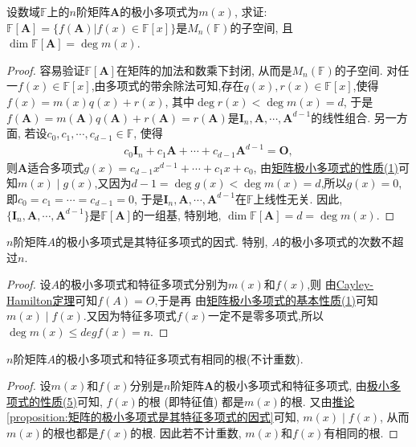 \documentclass[../../main.tex]{subfiles}%
\begin{document}
\begin{proposition}\label{proposition:F[A]的维数等于A的极小多项式的次数}
设数域\(\mathbb{F}\)上的\(n\)阶矩阵\(\boldsymbol{A}\)的极小多项式为\(m(x)\), 求证: \(\mathbb{F}[\boldsymbol{A}] = \{f(\boldsymbol{A})|f(x)\in\mathbb{F}[x]\}\)是\(M_n(\mathbb{F})\)的子空间, 且\(\dim\mathbb{F}[\boldsymbol{A}] = \deg m(x)\).
\end{proposition}
\begin{proof}
容易验证\(\mathbb{F}[\boldsymbol{A}]\)在矩阵的加法和数乘下封闭, 从而是\(M_n(\mathbb{F})\)的子空间. 对任一\(f(x)\in\mathbb{F}[x]\),由多项式的带余除法可知,存在$q(x),r(x)\in \mathbb{F}[x]$,使得\(f(x) = m(x)q(x) + r(x)\), 其中\(\deg r(x)<\deg m(x) = d\), 于是\(f(\boldsymbol{A}) = m(\boldsymbol{A})q(\boldsymbol{A}) + r(\boldsymbol{A}) = r(\boldsymbol{A})\)是\(\boldsymbol{I}_n,\boldsymbol{A},\cdots,\boldsymbol{A}^{d - 1}\)的线性组合. 另一方面, 若设\(c_0,c_1,\cdots,c_{d - 1}\in\mathbb{F}\), 使得
\begin{align*}
c_0\boldsymbol{I}_n + c_1\boldsymbol{A}+\cdots + c_{d - 1}\boldsymbol{A}^{d - 1} = \boldsymbol{O},
\end{align*}
则\(\boldsymbol{A}\)适合多项式\(g(x) = c_{d - 1}x^{d - 1}+\cdots + c_1x + c_0\), 由\hyperref[proposition:极小多项式的性质]{矩阵极小多项式的性质(1)}可知$m(x)\mid g(x)$,又因为\(d-1=\deg g(x)<\deg m(x) = d\),所以\(g(x) = 0\), 即\(c_0 = c_1 = \cdots = c_{d - 1} = 0\), 于是\(\boldsymbol{I}_n,\boldsymbol{A},\cdots,\boldsymbol{A}^{d - 1}\)在\(\mathbb{F}\)上线性无关. 因此, \(\{\boldsymbol{I}_n,\boldsymbol{A},\cdots,\boldsymbol{A}^{d - 1}\}\)是\(\mathbb{F}[\boldsymbol{A}]\)的一组基, 特别地, \(\dim\mathbb{F}[\boldsymbol{A}] = d = \deg m(x)\). 
\end{proof}

\begin{proposition}\label{proposition:矩阵的极小多项式是其特征多项式的因式}
$n$阶矩阵$A$的极小多项式是其特征多项式的因式. 特别, $A$的极小多项式的次数不超过$n$.
\end{proposition}
\begin{proof}
设$A$的极小多项式和特征多项式分别为$m(x)$和$f(x)$,则
由\hyperref[theorem:Cayley-Hamilton定理]{Cayley-Hamilton定理}可知$f(A)=O$,于是再
由\hyperref[proposition:极小多项式的性质]{矩阵极小多项式的基本性质(1)}可知$m(x)\mid f(x)$.又因为特征多项式$f(x)$一定不是零多项式,所以$\deg m(x)\leqslant  deg f(x)=n$.
\end{proof}

\begin{corollary}\label{corollary:极小多项式和特征多项式有相同的根(不计重数)}
$n$阶矩阵$A$的极小多项式和特征多项式有相同的根(不计重数).
\end{corollary}
\begin{proof}
设\(m(x)\)和\(f(x)\)分别是\(n\)阶矩阵\(\boldsymbol{A}\)的极小多项式和特征多项式,
由\hyperref[proposition:极小多项式的性质]{极小多项式的性质(5)}可知, \(f(x)\)的根 (即特征值) 都是\(m(x)\)的根. 又由\hyperref[proposition:矩阵的极小多项式是其特征多项式的因式]{推论\ref{proposition:矩阵的极小多项式是其特征多项式的因式}}可知, \(m(x)\mid f(x)\), 从而\(m(x)\)的根也都是\(f(x)\)的根. 因此若不计重数, \(m(x)\)和\(f(x)\)有相同的根. 
\end{proof}
\end{document}

